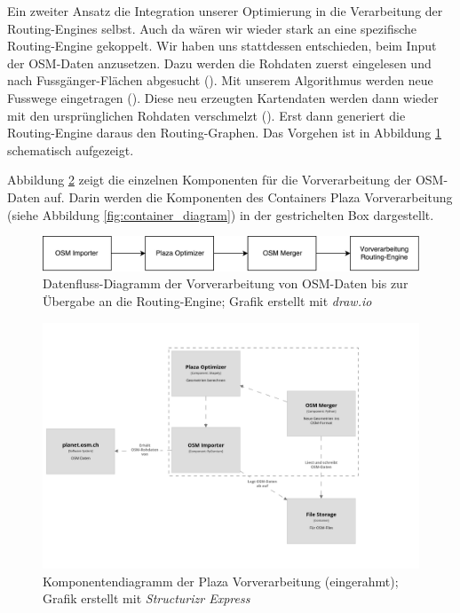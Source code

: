 Ein zweiter Ansatz die Integration unserer Optimierung in die Verarbeitung der Routing-Engines selbst. Auch da wären wir wieder stark an eine spezifische Routing-Engine gekoppelt.
Wir haben uns stattdessen entschieden, beim Input der \ac{OSM}-Daten anzusetzen. Dazu werden die Rohdaten zuerst eingelesen und nach Fussgänger-Flächen abgesucht (). Mit unserem Algorithmus werden neue Fusswege eingetragen (). Diese neu erzeugten Kartendaten werden dann wieder mit den ursprünglichen Rohdaten verschmelzt (). Erst dann generiert die Routing-Engine daraus den Routing-Graphen. Das Vorgehen ist in Abbildung \ref{fig:dataflow_vorverarbeitung} schematisch aufgezeigt.

Abbildung \ref{fig:component_diagram_vorverarbeitung} zeigt die einzelnen Komponenten für die Vorverarbeitung der \ac{OSM}-Daten auf. Darin werden die Komponenten des Containers Plaza Vorverarbeitung (siehe Abbildung \ref{fig:container_diagram}) in der gestrichelten Box dargestellt.


\begin{figure}[ht]
    \centering
    \includegraphics[width=1\linewidth]{projectdoc/img/dataflow_vorverarbeitung.pdf}
    \caption[Datenfluss Vorverarbeitung]{Datenfluss-Diagramm der Vorverarbeitung von \ac{OSM}-Daten bis zur Übergabe an die Routing-Engine; Grafik erstellt mit \emph{draw.io}}
    \label{fig:dataflow_vorverarbeitung}
\end{figure}


\begin{figure}[ht]
    \centering
    \includegraphics[width=1\linewidth]{projectdoc/img/component_diagram_plaza-vorverarbeitung.png}
    \caption[Komponentendiagramm Vorverarbeitung]{Komponentendiagramm der Plaza Vorverarbeitung (eingerahmt); Grafik erstellt mit \emph{Structurizr Express}\cite{structurizr}}
    \label{fig:component_diagram_vorverarbeitung}
\end{figure}


